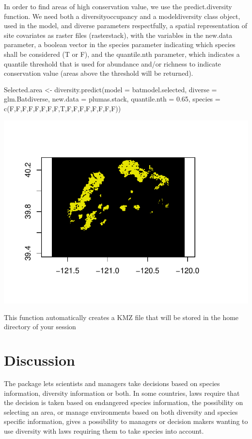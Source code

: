 \documentclass[article]{jss}
\begin{document}
In order to find areas of high conservation value, we use the
predict.diversity function. We need both a diversityoccupancy and a
modeldiversity class object, used in the model, and diverse parameters
respectfully, a spatial representation of site covariates as raster
files (rasterstack), with the variables in the new.data parameter, a
boolean vector in the species parameter indicating which species shall
be considered (T or F), and the quantile.nth parameter, which indicates
a quantile threshold that is used for abundance and/or richness to
indicate conservation value (areas above the threshold will be
returned).

\begin{CodeChunk}
\begin{CodeInput}
Selected.area <- diversity.predict(model = batmodel.selected, diverse = glm.Batdiverse, new.data = plumas.stack, quantile.nth = 0.65, species =
c(F,F,F,F,F,F,F,F,T,F,F,F,F,F,F,F,F))
\end{CodeInput}


\begin{center}\includegraphics{diversityocc_files/figure-latex/unnamed-chunk-22-1} \end{center}

\end{CodeChunk}

This function automatically creates a KMZ file that will be stored in
the home directory of your session

\section{Discussion}\label{discussion}

The  package lets scientists and managers take
decisions based on species information, diversity information or both.
In some countries, laws require that the decision is taken based on
endangered species information, the possibility on selecting an area, or
manage environments based on both diversity and species specific
information, gives a possibility to managers or decision makers wanting
to use diversity with laws requiring them to take species into account.

\renewcommand\refname{References}

\end{document}
